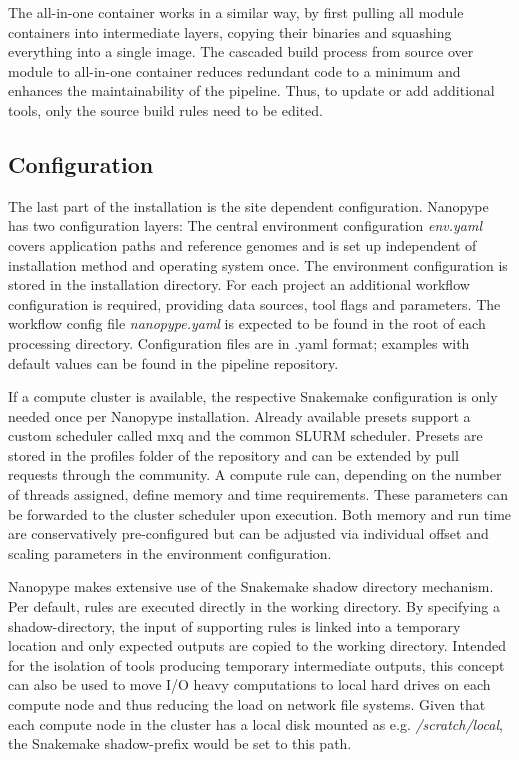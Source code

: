 The all-in-one container works in a similar way, by first pulling all module containers into intermediate layers, copying their binaries and squashing everything into a single image. The cascaded build process from source over module to all-in-one container reduces redundant code to a minimum and enhances the maintainability of the pipeline. Thus, to update or add additional tools, only the source build rules need to be edited.


\subsection{Configuration}

The last part of the installation is the site dependent configuration. Nanopype has two configuration layers: The central environment configuration \textit{env.yaml} covers application paths and reference genomes and is set up independent of installation method and operating system once. The environment configuration is stored in the installation directory. For each project an additional workflow configuration is required, providing data sources, tool flags and parameters. The workflow config file \textit{nanopype.yaml} is expected to be found in the root of each processing directory. Configuration files are in .yaml format; examples with default values can be found in the pipeline repository.

If a compute cluster is available, the respective Snakemake configuration is only needed once per Nanopype installation. Already available presets support a custom scheduler called mxq and the common SLURM scheduler. Presets are stored in the profiles folder of the repository and can be extended by pull requests through the community. A compute rule can, depending on the number of threads assigned, define memory and time requirements. These parameters can be forwarded to the cluster scheduler upon execution. Both memory and run time are conservatively pre-configured but can be adjusted via individual offset and scaling parameters in the environment configuration. 

Nanopype makes extensive use of the Snakemake shadow directory mechanism. Per default, rules are executed directly in the working directory. By specifying a shadow-directory, the input of supporting rules is linked into a temporary location and only expected outputs are copied to the working directory. Intended for the isolation of tools producing temporary intermediate outputs, this concept can also be used to move I/O heavy computations to local hard drives on each compute node and thus reducing the load on network file systems. Given that each compute node in the cluster has a local disk mounted as e.g. \textit{/scratch/local}, the Snakemake shadow-prefix would be set to this path.




